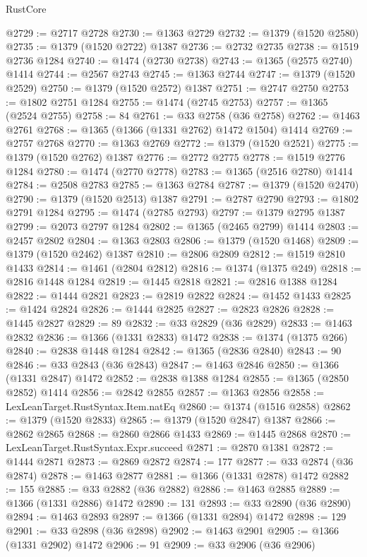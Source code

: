 \begin{lexlean}{RustCore}
\begin{coremodule}
@2729 := @2717 @2728
@2730 := @1363 @2729
@2732 := @1379 (@1520 @2580)
@2735 := @1379 (@1520 @2722) @1387
@2736 := @2732 @2735
@2738 := @1519 @2736 @1284
@2740 := @1474 (@2730 @2738)
@2743 := @1365 (@2575 @2740) @1414
@2744 := @2567 @2743
@2745 := @1363 @2744
@2747 := @1379 (@1520 @2529)
@2750 := @1379 (@1520 @2572) @1387
@2751 := @2747 @2750
@2753 := @1802 @2751 @1284
@2755 := @1474 (@2745 @2753)
@2757 := @1365 (@2524 @2755)
@2758 := 84
@2761 := @33 @2758 (@36 @2758)
@2762 := @1463 @2761
@2768 := @1365 (@1366 (@1331 @2762) @1472 @1504) @1414
@2769 := @2757 @2768
@2770 := @1363 @2769
@2772 := @1379 (@1520 @2521)
@2775 := @1379 (@1520 @2762) @1387
@2776 := @2772 @2775
@2778 := @1519 @2776 @1284
@2780 := @1474 (@2770 @2778)
@2783 := @1365 (@2516 @2780) @1414
@2784 := @2508 @2783
@2785 := @1363 @2784
@2787 := @1379 (@1520 @2470)
@2790 := @1379 (@1520 @2513) @1387
@2791 := @2787 @2790
@2793 := @1802 @2791 @1284
@2795 := @1474 (@2785 @2793)
@2797 := @1379 @2795 @1387
@2799 := @2073 @2797 @1284
@2802 := @1365 (@2465 @2799) @1414
@2803 := @2457 @2802
@2804 := @1363 @2803
@2806 := @1379 (@1520 @1468)
@2809 := @1379 (@1520 @2462) @1387
@2810 := @2806 @2809
@2812 := @1519 @2810 @1433
@2814 := @1461 (@2804 @2812)
@2816 := @1374 (@1375 @249)
@2818 := @2816 @1448 @1284
@2819 := @1445 @2818
@2821 := @2816 @1388 @1284
@2822 := @1444 @2821
@2823 := @2819 @2822
@2824 := @1452 @1433
@2825 := @1424 @2824
@2826 := @1444 @2825
@2827 := @2823 @2826
@2828 := @1445 @2827
@2829 := 89
@2832 := @33 @2829 (@36 @2829)
@2833 := @1463 @2832
@2836 := @1366 (@1331 @2833) @1472
@2838 := @1374 (@1375 @266)
@2840 := @2838 @1448 @1284
@2842 := @1365 (@2836 @2840)
@2843 := 90
@2846 := @33 @2843 (@36 @2843)
@2847 := @1463 @2846
@2850 := @1366 (@1331 @2847) @1472
@2852 := @2838 @1388 @1284
@2855 := @1365 (@2850 @2852) @1414
@2856 := @2842 @2855
@2857 := @1363 @2856
@2858 := LexLeanTarget.RustSyntax.Item.natEq
@2860 := @1374 (@1516 @2858)
@2862 := @1379 (@1520 @2833)
@2865 := @1379 (@1520 @2847) @1387
@2866 := @2862 @2865
@2868 := @2860 @2866 @1433
@2869 := @1445 @2868
@2870 := LexLeanTarget.RustSyntax.Expr.succeed
@2871 := @2870 @1381
@2872 := @1444 @2871
@2873 := @2869 @2872
@2874 := 177
@2877 := @33 @2874 (@36 @2874)
@2878 := @1463 @2877
@2881 := @1366 (@1331 @2878) @1472
@2882 := 155
@2885 := @33 @2882 (@36 @2882)
@2886 := @1463 @2885
@2889 := @1366 (@1331 @2886) @1472
@2890 := 131
@2893 := @33 @2890 (@36 @2890)
@2894 := @1463 @2893
@2897 := @1366 (@1331 @2894) @1472
@2898 := 129
@2901 := @33 @2898 (@36 @2898)
@2902 := @1463 @2901
@2905 := @1366 (@1331 @2902) @1472
@2906 := 91
@2909 := @33 @2906 (@36 @2906)

\end{coremodule}
\end{lexlean}

